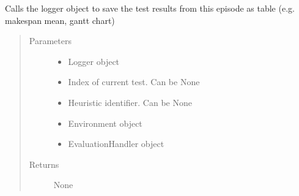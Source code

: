 \documentclass[letterpaper,10pt,english]{sphinxmanual}
\begin{document}
\begin{fulllineitems}
\label{\detokenize{agents.reinforcement_learning:agents.test.log_results}}
\sphinxAtStartPar
Calls the logger object to save the test results from this episode as table (e.g. makespan mean, gantt chart)
\begin{quote}\begin{description}
\item[{Parameters}] \leavevmode\begin{itemize}
\item {} 
\sphinxAtStartPar
{} \textendash{} Logger object

\item {} 
\sphinxAtStartPar
{} \textendash{} Index of current test. Can be None

\item {} 
\sphinxAtStartPar
{} \textendash{} Heuristic identifier. Can be None

\item {} 
\sphinxAtStartPar
{} \textendash{} Environment object

\item {} 
\sphinxAtStartPar
{} \textendash{} EvaluationHandler object

\end{itemize}

\item[{Returns}] \leavevmode
\sphinxAtStartPar
None

\end{description}\end{quote}

\end{fulllineitems}

\end{document}
